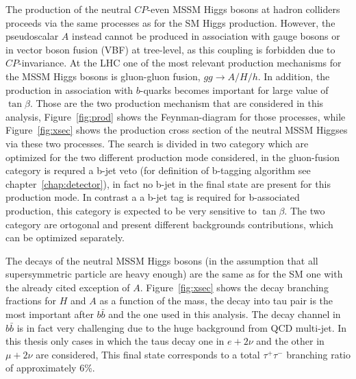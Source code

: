 The production of the neutral $CP$-even MSSM Higgs bosons at hadron
colliders proceeds via the same processes as for the SM Higgs
production. However, the pseudoscalar $A$ instead cannot be produced
in association with gauge bosons or in vector boson fusion (VBF) at
tree-level, as this coupling is forbidden due to $CP$-invariance.  At
the LHC one of the most relevant production mechanisms for the MSSM
Higgs bosons is gluon-gluon fusion, $gg\rightarrow A/H/h$. In
addition, the production in association with $b$-quarks becomes
important for large value of $\tan\beta$. Those are the two production mechanism
that are considered in this analysis, Figure~\ref{fig:prod} shows the Feynman-diagram
for those processes, while Figure~\ref{fig:xsec} shows the production cross section of the neutral 
MSSM Higgses via these two processes. The search is divided in two category which are optimized
for the two different production mode considered, in the gluon-fusion category
is requred a b-jet veto (for definition of b-tagging algorithm see chapter~\ref{chap:detector}), in fact no b-jet in the final state are present for this
production mode. In contrast a a b-jet tag is required for b-associated production,
this category is expected to be very sensitive to $\tan\beta$. The two category are
ortogonal and present different backgrounds contributions, which can be
optimized separately. 


The decays of the neutral
MSSM Higgs bosons (in the assumption that all supersymmetric particle
are heavy enough) are the same as for the SM one with the already
cited exception of $A$. Figure~\ref{fig:xsec} shows the decay branching fractions
for $H$ and $A$ as a function of the mass, 
the decay into tau pair is the most important after $b\bar{b}$ and the one used in this analysis. The 
decay channel in $b\bar{b}$ is in fact very challenging due to the huge background from
QCD multi-jet.
In this thesis only cases in which the taus decay one in $e + 2\nu$ and
the other in $\mu + 2\nu$ are considered, This final state corresponds to a total
$\tau^+\tau^-$ branching ratio of approximately 6\%.


